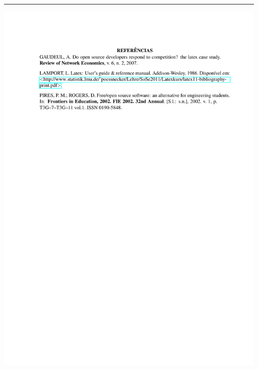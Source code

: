 {\hrule
\noindent\includegraphics[trim=0 20cm 0 0cm,clip]{contents/intro_writing_conference/references/utf-refs}

\clearpage
\restoregeometry}


